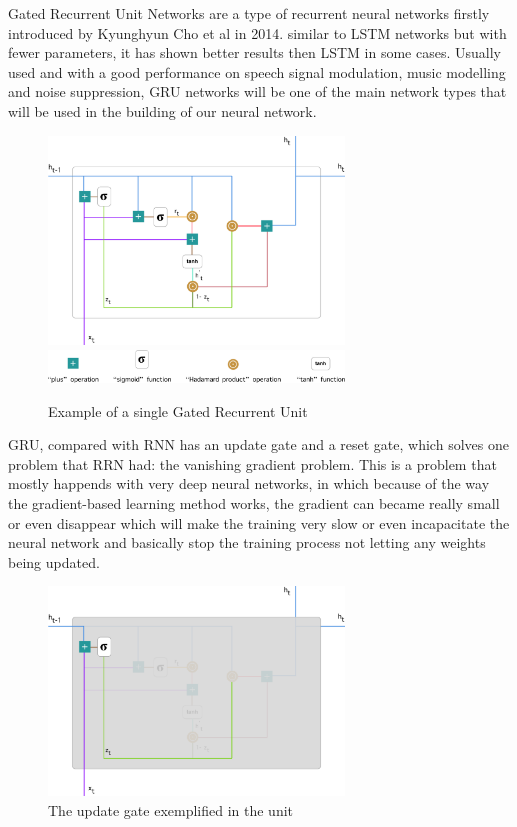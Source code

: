 Gated Recurrent Unit Networks are a type of recurrent neural networks firstly introduced by Kyunghyun Cho et al in 2014. similar to LSTM networks but with fewer parameters, it has shown better results then LSTM in some cases. Usually used and with a good performance on speech signal modulation, music modelling and noise suppression, GRU networks will be one of the main network types that will be used in the building of our neural network.

\begin{figure}[htp]
	\centering
	\includegraphics[width=0.7\textwidth]{Illustrations/GRU.png}
	\includegraphics[width=0.7\textwidth]{Illustrations/GRUsymbols.png}
	\caption{Example of a single Gated Recurrent Unit}
	\label{fig:GRU}
\end{figure}


GRU, compared with RNN has an update gate and a reset gate, which solves one problem that RRN had: the vanishing gradient problem. This is a problem that mostly happends with very deep neural networks, in which because of the way the gradient-based learning method works, the gradient can became really small or even disappear which will make the training very slow or even incapacitate the neural network and basically stop the training process not letting any weights being updated.


\begin{figure}[htp]
	\centering
	\includegraphics[width=0.7\textwidth]{Illustrations/GRUupdategate.png}
	\caption{The update gate exemplified in the unit}
	\label{fig:GRUupdategate}
\end{figure}


